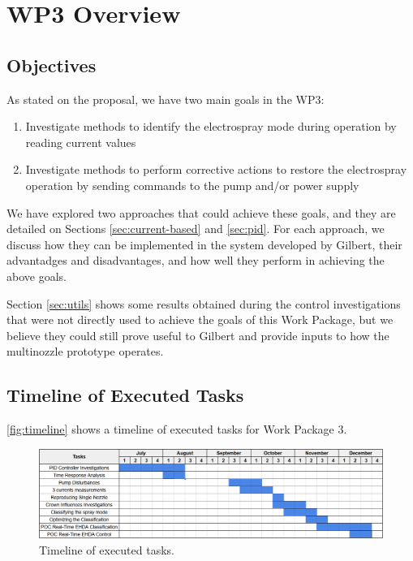 \documentclass[oneside,12pt]{article}
\begin{document}
\setlength{\parindent}{0 em}  %
\setlength{\parskip}{0.7 em}    %

\newpage    \pagestyle{empty}
\tableofcontents
\pagestyle{fancy}
\newpage

\section{WP3 Overview}

\subsection{Objectives}

As stated on the proposal, we have two main goals in the WP3:

\begin{enumerate}
    \item Investigate methods to identify the electrospray mode during operation by reading current values
    \item Investigate methods to perform corrective actions to restore the electrospray operation by sending 
    commands to the pump and/or power supply
\end{enumerate}

We have explored two approaches that could achieve these goals, and they are detailed on Sections \ref{sec:current-based} and
\ref{sec:pid}. For each approach, we discuss how they can be implemented in the system developed by Gilbert,
their advantadges and disadvantages, and how well they perform in achieving the above goals. 

Section \ref{sec:utils} shows some results obtained during the control investigations that were not directly used to achieve
the goals of this Work Package, but we believe they could still prove useful to Gilbert and provide inputs to how the
multinozzle prototype operates.

\subsection{Timeline of Executed Tasks}

\autoref{fig:timeline} shows a timeline of executed tasks for Work Package 3.

\begin{figure}[h!]
    \centering
    \includegraphics[width=\textwidth,trim=1 1 1 1,clip]{figures/timeline.png}
    \caption{Timeline of executed tasks.}
    \label{fig:timeline}
\end{figure}
\end{document}
